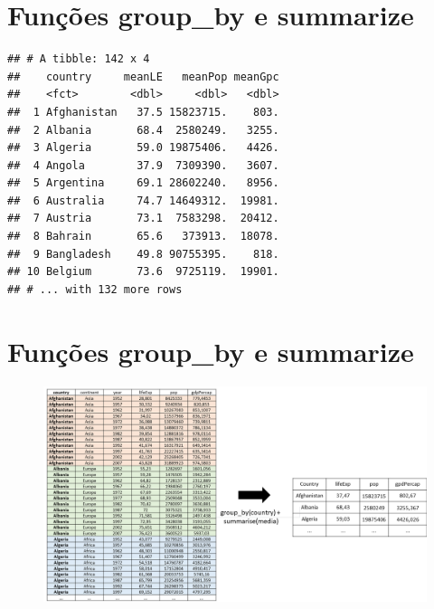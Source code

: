 \documentclass[
]{article}
\newenvironment{Shaded}{\begin{snugshade}}{\end{snugshade}}
\newcommand{\DataTypeTok}[1]{\textcolor[rgb]{0.13,0.29,0.53}{#1}}
\newcommand{\KeywordTok}[1]{\textcolor[rgb]{0.13,0.29,0.53}{\textbf{#1}}}
\newcommand{\NormalTok}[1]{#1}
\newcommand{\OperatorTok}[1]{\textcolor[rgb]{0.81,0.36,0.00}{\textbf{#1}}}
\newcommand{\StringTok}[1]{\textcolor[rgb]{0.31,0.60,0.02}{#1}}
\begin{document}
\hypertarget{funuxe7uxf5es-group_by-e-summarize}{%
\section{Funções group\_by e
summarize}\label{funuxe7uxf5es-group_by-e-summarize}}

\begin{Shaded}
\end{Shaded}

\begin{verbatim}
## # A tibble: 142 x 4
##    country     meanLE   meanPop meanGpc
##    <fct>        <dbl>     <dbl>   <dbl>
##  1 Afghanistan   37.5 15823715.    803.
##  2 Albania       68.4  2580249.   3255.
##  3 Algeria       59.0 19875406.   4426.
##  4 Angola        37.9  7309390.   3607.
##  5 Argentina     69.1 28602240.   8956.
##  6 Australia     74.7 14649312.  19981.
##  7 Austria       73.1  7583298.  20412.
##  8 Bahrain       65.6   373913.  18078.
##  9 Bangladesh    49.8 90755395.    818.
## 10 Belgium       73.6  9725119.  19901.
## # ... with 132 more rows
\end{verbatim}

\hypertarget{funuxe7uxf5es-group_by-e-summarize-1}{%
\section{Funções group\_by e
summarize}\label{funuxe7uxf5es-group_by-e-summarize-1}}

\begin{figure}

{\centering \includegraphics[width=1\linewidth,height=1\textheight]{imagem/group_by} 

}

\caption{ }\label{fig:group_by, figures-side}
\end{figure}
\end{document}
